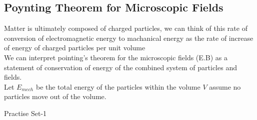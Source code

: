\subsection{Poynting Theorem for Microscopic Fields}
Matter is ultimately composed of charged particles, we can think of this rate of conversion of electromagnetic energy to machanical energy as the rate of increase of energy of charged particles per unit volume\\
We can interpret pointing's theorem for the microscopic fields (E.B) as a statement of conservation of energy of the combined system of particles and fields.\\
Let $E_{mech}$ be the total energy of the particles within the volume $V$ assume no particles move out of the volume.


\newpage
\begin{abox}
Practise Set-1
\end{abox}
